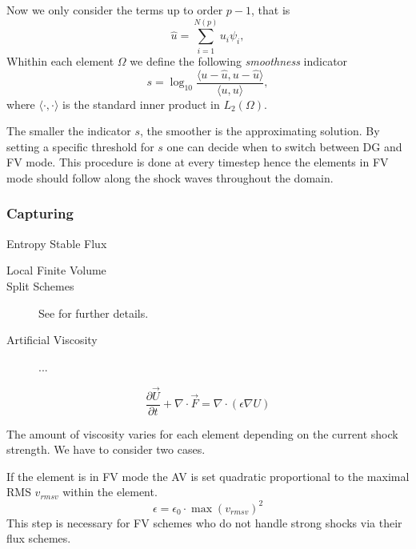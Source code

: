 Now we only consider the terms up to order $p-1$,
that is
\begin{equation}
    \hat{u} = \sum^{N(p)}_{i=1} u_i \psi_i,
\end{equation}
Whithin each element $\Omega$ we define the following \emph{smoothness} indicator
\begin{equation}
    s = \log_{10} \frac{\langle u - \hat{u}, u - \hat{u} \rangle}{\langle u, u \rangle},
\end{equation}
where $\langle \cdot,\cdot \rangle$ is the standard inner product in $L_2(\Omega)$.

The smaller the indicator $s$, the smoother is the approximating solution.  By
setting a specific threshold for $s$ one can decide when to switch between DG
and FV mode. This procedure is done at every timestep hence the elements in FV mode
should follow along the shock waves throughout the domain.

\subsubsection{Capturing}



\begin{description}
    \item[Entropy Stable Flux] \cite{derigs2016}
    \item[Local Finite Volume] 
    \item[Split Schemes] See \cite{gassner2016} for further details.
    \item[Artificial Viscosity] ...
\end{description}

\begin{equation}
\label{eq:persson-indicator-gov-equ}
    \frac{\partial\vec{U}}{\partial t} + \nabla \cdot \vec{F} = \nabla \cdot (\epsilon \nabla U)
\end{equation}

The amount of viscosity varies for each element depending on the current shock
strength. We have to consider two cases.

If the element is in FV mode the AV is set quadratic proportional to the
maximal RMS $v_{rmsv}$ within the element.
\begin{equation}
    \epsilon = \epsilon_0 \cdot \max(v_{rmsv})^2    
\end{equation}
This step is necessary for FV schemes who do not handle strong shocks via their
flux schemes.

